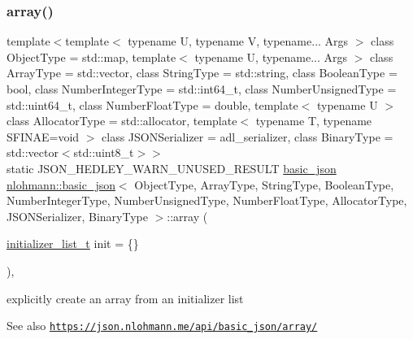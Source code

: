 \subsubsection{\texorpdfstring{array()}{array()}}
{\footnotesize\ttfamily template$<$template$<$ typename U, typename V, typename... Args $>$ class Object\+Type = std\+::map, template$<$ typename U, typename... Args $>$ class Array\+Type = std\+::vector, class String\+Type  = std\+::string, class Boolean\+Type  = bool, class Number\+Integer\+Type  = std\+::int64\+\_\+t, class Number\+Unsigned\+Type  = std\+::uint64\+\_\+t, class Number\+Float\+Type  = double, template$<$ typename U $>$ class Allocator\+Type = std\+::allocator, template$<$ typename T, typename S\+F\+I\+N\+A\+E=void $>$ class J\+S\+O\+N\+Serializer = adl\+\_\+serializer, class Binary\+Type  = std\+::vector$<$std\+::uint8\+\_\+t$>$$>$ \\
static J\+S\+O\+N\+\_\+\+H\+E\+D\+L\+E\+Y\+\_\+\+W\+A\+R\+N\+\_\+\+U\+N\+U\+S\+E\+D\+\_\+\+R\+E\+S\+U\+LT \hyperlink{classnlohmann_1_1basic__json}{basic\+\_\+json} \hyperlink{classnlohmann_1_1basic__json}{nlohmann\+::basic\+\_\+json}$<$ Object\+Type, Array\+Type, String\+Type, Boolean\+Type, Number\+Integer\+Type, Number\+Unsigned\+Type, Number\+Float\+Type, Allocator\+Type, J\+S\+O\+N\+Serializer, Binary\+Type $>$\+::array (\begin{DoxyParamCaption}\item[{\hyperlink{classnlohmann_1_1basic__json_ac569f292a070dfd2f6b69c16e746095a}{initializer\+\_\+list\+\_\+t}}]{init = {\ttfamily \{\}} }\end{DoxyParamCaption})\hspace{0.3cm}{\ttfamily [inline]}, {\ttfamily [static]}}



explicitly create an array from an initializer list 

\begin{DoxySeeAlso}{See also}
\href{https://json.nlohmann.me/api/basic_json/array/}{\tt https\+://json.\+nlohmann.\+me/api/basic\+\_\+json/array/} 
\end{DoxySeeAlso}
\mbox{\label{classnlohmann_1_1basic__json_a52b18a5b7e68652c65b070900c438c6e}} 
